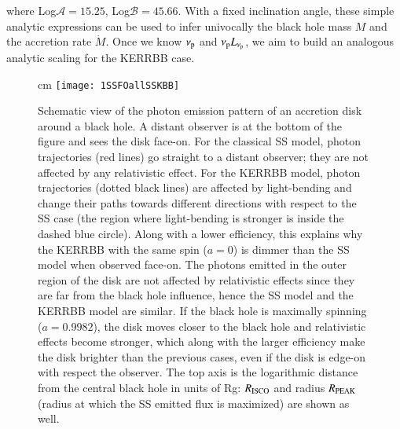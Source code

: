\documentclass{aa}
\begin{document}
\noindent where Log$\mathcal{A} = 15.25$, Log$\mathcal{B}=45.66$. With a fixed inclination angle, these simple analytic expressions can be used to infer univocally the black hole mass $M$ and the accretion rate $\dot{M}$. Once we know $\nu_{\rm p}$ and $\nu_{\rm p} L_{\nu_{\rm p}}$, we aim to build an analogous analytic scaling for the KERRBB case.

\begin{figure}
\centering
{} cm
\texttt{[image: 1SSFOallSSKBB]}
\caption{Schematic view of the photon emission pattern of an accretion disk around a black hole. A distant observer is at the bottom of the figure and sees the disk face-on. For the classical SS model, photon trajectories (red lines) go straight to a distant observer; they are not affected by any relativistic effect. For the KERRBB model, photon trajectories (dotted black lines) are affected by light-bending and change their paths towards different directions with respect to the SS case (the region where light-bending is stronger is inside the dashed blue circle). Along with a lower efficiency, this explains why the KERRBB with the same spin ($a = 0$) is dimmer than the SS model when observed face-on. The photons emitted in the outer region of the disk are not affected by relativistic effects since they are far from the black hole influence, hence the SS model and the KERRBB model are similar. If the black hole is maximally spinning ($a = 0.9982$), the disk moves closer to the black hole and relativistic effects become stronger, which along with the larger efficiency make the disk brighter than the previous cases, even if the disk is edge-on with respect the observer. The top axis is the logarithmic distance from the central black hole in units of Rg: $R_{\rm ISCO}$ and radius $R_{\rm PEAK}$ (radius at which the SS emitted flux is maximized) are shown as well.} 
\label{fig:figurabella}
\end{figure}
\end{document}
